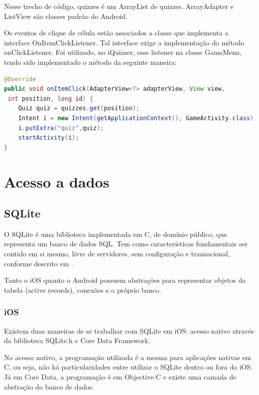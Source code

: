 	Nesse trecho de código, quizzes é um ArrayList de quizzes. ArrayAdapter e ListView são classes padrão do Android.  
    
	Os eventos de clique de célula estão associados a classe que implementa a interface OnItemClickListener.  Tal interface exige a implementação do método onClickListener. Foi utilizado, no iQuizzer, esse listener na classe GameMenu, tendo sido implementado o método da seguinte maneira:
\begin{lstlisting}[language=Java]   
@Override
public void onItemClick(AdapterView<?> adapterView, View view,
 int position, long id) {
    Quiz quiz = quizzes.get(position);
    Intent i = new Intent(getApplicationContext(), GameActivity.class);
    i.putExtra("quiz",quiz);
    startActivity(i);
}
             \end{lstlisting}    
    \section {Acesso a dados}
     
    \subsection {SQLite}
	
            O SQLite é uma biblioteca implementada em C, de domínio público, que representa um banco de dados SQL. Tem como características fundamentais ser contido em si mesmo, livre de servidores, sem configuração e transacional, conforme descrito em \cite{SQLite}.
            
			Tanto o iOS quanto o Android possuem abstrações para representar objetos da tabela (active records), conexões e o próprio banco.
     
    \subsubsection{iOS}
            Existem duas maneiras de se trabalhar com SQLite em iOS: acesso nativo através da biblioteca SQLite.h e Core Data Framework.
           
		    No acesso nativo, a programação utilizada é a mesma para aplicações nativas em C, ou seja, não há particularidades entre utilizar o SQLite dentro ou fora do iOS. Já em Core Data, a programação é em Objective-C e existe uma camada de abstração do banco de dados.
           
